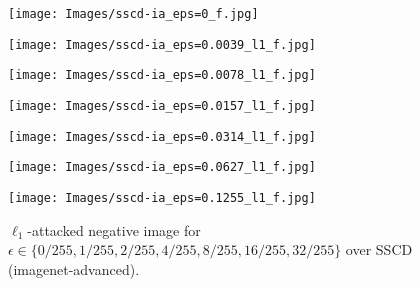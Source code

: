 \documentclass[12pt]{article}
\begin{document}
\begin{figure}[ht]
  \begin{minipage}{0.125\textwidth}
    \texttt{[image: Images/sscd-ia\_eps=0\_f.jpg]}
  \end{minipage}
  \hfill
  \begin{minipage}{0.125\textwidth}
    \texttt{[image: Images/sscd-ia\_eps=0.0039\_l1\_f.jpg]}
  \end{minipage}
  \hfill
  \begin{minipage}{0.125\textwidth}
    \texttt{[image: Images/sscd-ia\_eps=0.0078\_l1\_f.jpg]}
  \end{minipage}
  \hfill
  \begin{minipage}{0.125\textwidth}
    \texttt{[image: Images/sscd-ia\_eps=0.0157\_l1\_f.jpg]}
  \end{minipage}
  \hfill
  \begin{minipage}{0.125\textwidth}
    \texttt{[image: Images/sscd-ia\_eps=0.0314\_l1\_f.jpg]}
  \end{minipage}
  \hfill
  \begin{minipage}{0.125\textwidth}
    \texttt{[image: Images/sscd-ia\_eps=0.0627\_l1\_f.jpg]}
  \end{minipage}
  \hfill
  \begin{minipage}{0.125\textwidth}
    \texttt{[image: Images/sscd-ia\_eps=0.1255\_l1\_f.jpg]}
  \end{minipage}
  \label{fig:sscd_l1_negative_examples}
  \caption{$\ell_1$-attacked negative image for $\epsilon \in \{0/255, 1/255, 2/255, 4/255, 8/255, 16/255, 32/255\}$ over SSCD (imagenet-advanced).}
\end{figure}
\end{document}
